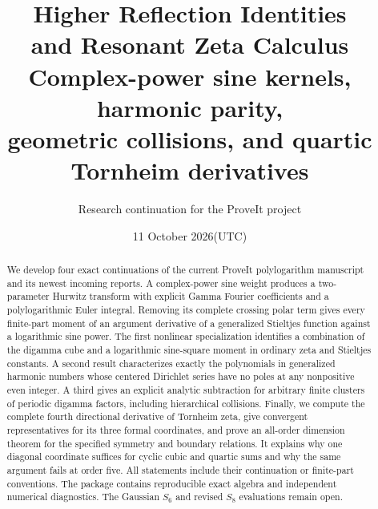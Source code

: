 

\title{\textbf{Higher Reflection Identities\\and Resonant Zeta Calculus}\\[0.6em]
\large Complex-power sine kernels, harmonic parity,\\
geometric collisions, and quartic Tornheim derivatives}
\author{Research continuation for the ProveIt project}
\date{11 October 2026\quad (UTC)}
\maketitle
\begin{abstract}
We develop four exact continuations of the current ProveIt polylogarithm
manuscript and its newest incoming reports. A complex-power sine weight
produces a two-parameter Hurwitz transform with explicit Gamma Fourier
coefficients and a polylogarithmic Euler integral. Removing its complete
crossing polar term gives every finite-part moment of an argument
derivative of a generalized Stieltjes function against a logarithmic
sine power. The first nonlinear specialization identifies a combination
of the digamma cube and a logarithmic sine-square moment in ordinary
zeta and Stieltjes constants. A second result characterizes exactly the
polynomials in generalized harmonic numbers whose centered Dirichlet
series have no poles at any nonpositive even integer. A third gives an
explicit analytic subtraction for arbitrary finite clusters of periodic
digamma factors, including hierarchical collisions. Finally, we compute
the complete fourth directional derivative of Tornheim zeta, give
convergent representatives for its three formal coordinates, and prove
an all-order dimension theorem for the specified symmetry and boundary
relations. It explains why one diagonal coordinate suffices for cyclic
cubic and quartic sums and why the same argument fails at order five.
All statements include their continuation or finite-part conventions.
The package contains reproducible exact algebra and independent numerical
diagnostics. The Gaussian $S_6$ and revised $S_8$ evaluations remain open.
\end{abstract}
\clearpage
\begingroup
\small
\setlength{\parskip}{0pt}
\tableofcontents
\endgroup
\clearpage








